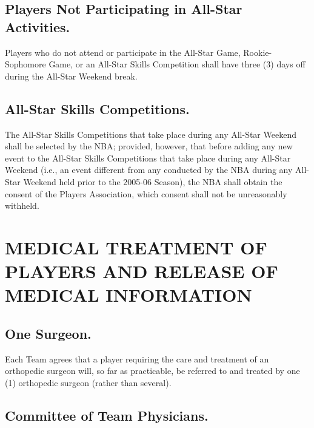 \documentclass[
]{book}
\begin{document}
\hypertarget{players-not-participating-in-all-star-activities.}{%
\section{Players Not Participating in All-Star Activities.}\label{players-not-participating-in-all-star-activities.}}

Players who do not attend or participate in the All-Star Game, Rookie-Sophomore Game, or an All-Star Skills Competition shall have three (3) days off during the All-Star Weekend break.

\hypertarget{all-star-skills-competitions.}{%
\section{All-Star Skills Competitions.}\label{all-star-skills-competitions.}}

The All-Star Skills Competitions that take place during any All-Star Weekend shall be selected by the NBA; provided, however, that before adding any new event to the All-Star Skills Competitions that take place during any All-Star Weekend (i.e., an event different from any conducted by the NBA during any All-Star Weekend held prior to the 2005-06 Season), the NBA shall obtain the consent of the Players Association, which consent shall not be unreasonably withheld.

\hypertarget{medical-treatment-of-players-and-release-of-medical-information}{%
\chapter{MEDICAL TREATMENT OF PLAYERS AND RELEASE OF MEDICAL INFORMATION}\label{medical-treatment-of-players-and-release-of-medical-information}}


\hypertarget{one-surgeon.}{%
\section{One Surgeon.}\label{one-surgeon.}}

Each Team agrees that a player requiring the care and treatment of an orthopedic surgeon will, so far as practicable, be referred to and treated by one (1) orthopedic surgeon (rather than several).

\hypertarget{committee-of-team-physicians.}{%
\section{Committee of Team Physicians.}\label{committee-of-team-physicians.}}
\end{document}
